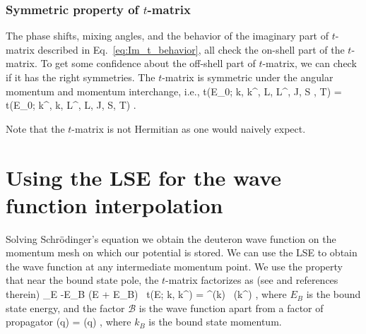   \subsubsection{Symmetric property of $t$-matrix}

  The phase shifts, mixing angles, and the behavior of the imaginary part of
  $t$-matrix described in Eq.~\eqref{eq:Im_t_behavior}, all check the
  on-shell part of the $t$-matrix.  To get some confidence about the off-shell
  part of $t$-matrix, we can check if it has the right symmetries.
  The $t$-matrix is symmetric under the angular momentum and momentum
  interchange, i.e.,
  \beq
  t(E_0; k, k^\prime, L, L^\prime, J, S , T) = t(E_0; k^\prime, k, L^\prime, L,
  J, S, T) \;.
  \eeq

  Note that the $t$-matrix is not Hermitian as one would naively expect.


  \section{Using the LSE for the wave function interpolation}

  Solving Schr\"{o}dinger's equation we obtain the deuteron wave function
  on the momentum mesh on which our potential is stored.  We can use the LSE
  to obtain the wave function at any intermediate momentum point.
  We use the property that near the bound state pole, the $t$-matrix
  factorizes as (see \cite{Koenig:2013} and references therein)
  \beq
  \lim_{E \to -E_B} (E + E_B) \, t(E; k, k^\prime) = ^\ast (k) \,
   (k^\prime) \;,
  \label{eq:t_near_pole}
  \eeq
  where $E_B$ is the bound state energy, and the factor $\mathcal{B}$ is
  the wave function apart from a factor of propagator
  \beq
  (q) =  \psi(q) \;,
  \label{eq:B_psi_relation}
  \eeq
  where $k_B$ is the bound state momentum.


